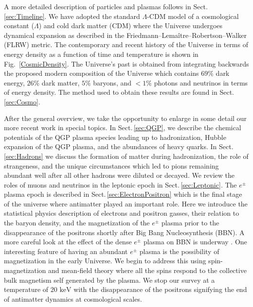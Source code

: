 \documentclass[universe,article,submit,moreauthors,pdftex,a4paper]{Definitions/mdpi}
\newcommand{\keV}{\text{ keV}}
\newcommand*{\rf}[1]{Fig.~{\ref{#1}}}
\newcommand*{\rsec}[1]{Sect.\,{\ref{#1}}}
\begin{document}
A more detailed description of particles and plasmas follows in \rsec{sec:Timeline}. We have adopted the standard $\Lambda$-CDM model of a cosmological constant ($\Lambda$) and cold dark matter (CDM) where the Universe undergoes dynamical expansion as described in the Friedmann–Lemaître–Robertson–Walker (FLRW) metric. The contemporary and recent history of the Universe in terms of energy density as a function of time and temperature is shown in \rf{CosmicDensity}. The Universe's past is obtained from integrating backwards the proposed modern composition of the Universe which contains $69\%$ dark energy, $26\%$ dark matter, $5\%$ baryons, and $<1\%$ photons and neutrinos in terms of energy density. The method used to obtain these results are found in \rsec{sec:Cosmo}.

After the general overview, we take the opportunity to enlarge in some detail our more recent work in special topics. In \rsec{sec:QGP}, we describe the chemical potentials of the QGP plasma species leading up to hadronization, Hubble expansion of the QGP plasma, and the abundances of heavy quarks. In \rsec{sec:Hadrons} we discuss the formation of matter during hadronization, the role of strangeness, and the unique circumstances which led to pions remaining abundant well after all other hadrons were diluted or decayed. We review the roles of muons and neutrinos in the leptonic epoch in \rsec{sec:Leptonic}. The $e^{\pm}$ plasma epoch is described in \rsec{sec:ElectronPositron} which is the final stage of the universe where antimatter played an important role. Here we introduce the statistical physics description of electrons and positron gasses, their relation to the baryon density, and the magnetization of the $e^{\pm}$ plasma prior to the disappearance of the positrons shortly after Big Bang Nucleosynthesis (BBN). A more careful look at the effect of the dense $e^{\pm}$ plasma on BBN is underway \cite{Chris:2023abc}. One interesting feature of having an abundant $e^{\pm}$ plasma is the possibility of magnetization \cite{Canuto:1968tav,Canuto:1968nzn} in the early Universe. We begin to address this using spin-magnetization and mean-field theory where all the spins respond to the collective bulk magnetism self generated by the plasma. We stop our survey at a temperature of $20\keV$ with the disappearance of the positrons signifying the end of antimatter dynamics at cosmological scales.
\end{document}
